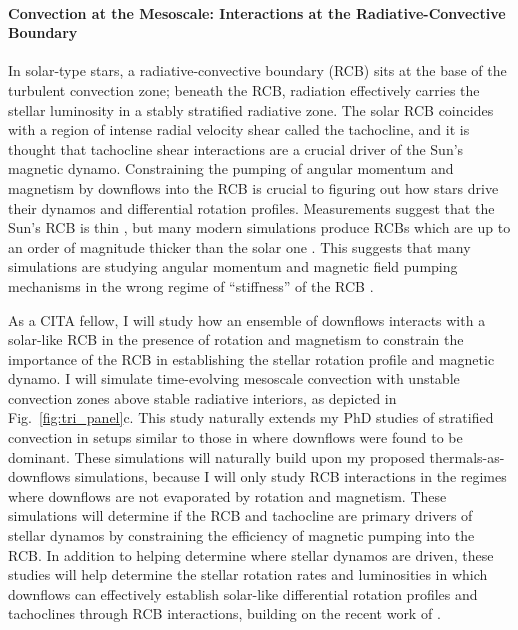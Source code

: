 \documentclass[preprint, hmargin=1in, vmargin=1in]{aastex62}
\begin{document}
\paragraph{Convection at the Mesoscale: Interactions at the Radiative-Convective Boundary}
In solar-type stars, a radiative-convective boundary (RCB) sits at the base of the turbulent convection zone; beneath the RCB, radiation effectively carries the stellar luminosity in a stably stratified radiative zone.
The solar RCB coincides with a region of intense radial velocity shear called the tachocline, and it is thought that tachocline shear interactions are a crucial driver of the Sun's magnetic dynamo.
Constraining the pumping of angular momentum and magnetism by downflows into the RCB is crucial to figuring out how stars drive their dynamos and differential rotation profiles.
Measurements suggest that the Sun's RCB is thin \citep{basu1997}, but many modern simulations produce RCBs which are up to an order of magnitude thicker than the solar one \citep{hotta2017}.
This suggests that many simulations are studying angular momentum and magnetic field pumping mechanisms in the wrong regime of ``stiffness'' of the RCB \citep{brummell&all2002, rogers&glatzmaier2005, couston&all2017}.

As a CITA fellow, I will study how an ensemble of downflows interacts with a solar-like RCB in the presence of rotation and magnetism to constrain the importance of the RCB in establishing the stellar rotation profile and magnetic dynamo.
I will simulate time-evolving mesoscale convection with unstable convection zones above stable radiative interiors, as depicted in Fig.~\ref{fig:tri_panel}c.
This study naturally extends my PhD studies of stratified convection \citep{anders&brown2017, anders&all2019} in setups similar to those in \citet{kapyla&all2017} where downflows were found to be dominant. 
These simulations will naturally build upon my proposed thermals-as-downflows simulations, because I will only study RCB interactions in the regimes where downflows are not evaporated by rotation and magnetism.
These simulations will determine if the RCB and tachocline are primary drivers of stellar dynamos by constraining the efficiency of magnetic pumping into the RCB.
In addition to helping determine where stellar dynamos are driven, these studies will help determine the stellar rotation rates and luminosities in which downflows can effectively establish solar-like differential rotation profiles and tachoclines through RCB interactions, building on the recent work of \citet{wood&brummell2018}.
\end{document}
